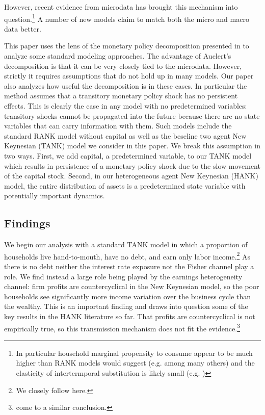 \documentclass[titlepage]{\econtex}\newcommand{\texname}{ConsumptionHeterogeneity}
\begin{document}
However, recent evidence from microdata has brought this mechanism into question.\footnote{In particular household marginal propensity to consume appear to be much higher than RANK models would suggest (e.g. \cite{parker_consumer_2013} among many others) and the elasticity of intertermporal substitution is likely small (e.g. \cite{best_estimating_2018})} A number of new models claim to match both the micro and macro data better.

This paper uses the lens of the monetary policy decomposition presented in \cite{auclert_monetary_2017} to analyze some standard modeling approaches. The advantage of Auclert's decomposition is that it can be very closely tied to the microdata.  However, strictly it requires assumptions that do not hold up in many models. Our paper also analyzes how useful the decomposition is in these cases. In particular the method assumes that a transitory monetary policy shock has no persistent effects.  This is clearly the case in any model with no predetermined variables: transitory shocks cannot be propagated into the future because there are no state variables that can carry information with them. Such models include the standard RANK model without capital as well as the beseline two agent New Keynesian (TANK) model we consider in this paper. We break this assumption in two ways. First, we add capital, a predetermined variable, to our TANK model which results in persistence of a monetary policy shock due to the slow movement of the capital stock. Second, in our heterogeneous agent New Keynesian (HANK) model, the entire distribution of assets is a predetermined state variable with potentially important dynamics.

\subsection{Findings}
We begin our analysis with a standard TANK model in which a proportion of households live hand-to-mouth, have no debt, and earn only labor income.\footnote{We closely follow \cite{dgHANKTANK} here.} As there is no debt neither the interest rate exposure not the Fisher channel play a role. We find instead a large role being played by the earnings heterogeneity channel: firm profits are countercyclical in the New Keynesian model, so the poor households see significantly more income variation over the business cycle than the wealthy. This is an important finding and draws into question some of the key results in the HANK literature so far. That profits are countercyclical is not empirically true, so this transmission mechanism does not fit the evidence.\footnote{\cite{broer_2018} come to a similar conclusion.}
\end{document}

